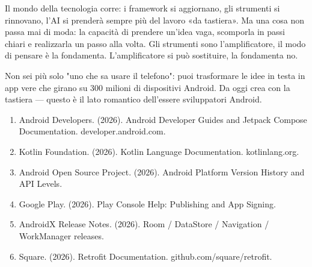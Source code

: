 Il mondo della tecnologia corre: i framework si aggiornano, gli strumenti si rinnovano, l'AI si prenderà sempre più del lavoro «da tastiera». Ma una cosa non passa mai di moda: la capacità di prendere un'idea vaga, scomporla in passi chiari e realizzarla un passo alla volta. Gli strumenti sono l'amplificatore, il modo di pensare è la fondamenta. L'amplificatore si può sostituire, la fondamenta no.

Non sei più solo "uno che sa usare il telefono": puoi trasformare le idee in testa in app vere che girano su 300 milioni di dispositivi Android. Da oggi crea con la tastiera — questo è il lato romantico dell'essere sviluppatori Android.


\begin{enumerate}
  \item Android Developers. (2026). Android Developer Guides and Jetpack Compose Documentation. developer.android.com.
  \item Kotlin Foundation. (2026). Kotlin Language Documentation. kotlinlang.org.
  \item Android Open Source Project. (2026). Android Platform Version History and API Levels.
  \item Google Play. (2026). Play Console Help: Publishing and App Signing.
  \item AndroidX Release Notes. (2026). Room / DataStore / Navigation / WorkManager releases.
  \item Square. (2026). Retrofit Documentation. github.com/square/retrofit.
\end{enumerate}
